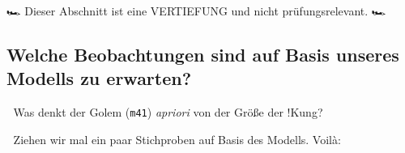 \documentclass[
  a4paper,
  DIV=11]{scrreprt}
\newenvironment{Shaded}{\begin{snugshade}}{\end{snugshade}}
\newcommand{\AttributeTok}[1]{\textcolor[rgb]{0.40,0.45,0.13}{#1}}
\newcommand{\DecValTok}[1]{\textcolor[rgb]{0.68,0.00,0.00}{#1}}
\newcommand{\FloatTok}[1]{\textcolor[rgb]{0.68,0.00,0.00}{#1}}
\newcommand{\FunctionTok}[1]{\textcolor[rgb]{0.28,0.35,0.67}{#1}}
\newcommand{\NormalTok}[1]{\textcolor[rgb]{0.00,0.23,0.31}{#1}}
\newcommand{\OtherTok}[1]{\textcolor[rgb]{0.00,0.23,0.31}{#1}}
\newcommand{\SpecialCharTok}[1]{\textcolor[rgb]{0.37,0.37,0.37}{#1}}
\theoremstyle{definition}
\theoremstyle{remark}
\begin{document}
🏎️ Dieser Abschnitt ist eine VERTIEFUNG und nicht prüfungsrelevant. 🏎

\hypertarget{welche-beobachtungen-sind-auf-basis-unseres-modells-zu-erwarten}{%
\subsection{Welche Beobachtungen sind auf Basis unseres Modells zu
erwarten?}\label{welche-beobachtungen-sind-auf-basis-unseres-modells-zu-erwarten}}

\begin{Shaded}
\end{Shaded}

💭 Was denkt der Golem (\texttt{m41}) \emph{apriori} von der Größe der
!Kung?

🦾 Ziehen wir mal ein paar Stichproben auf Basis des Modells. Voilà:
\end{document}
